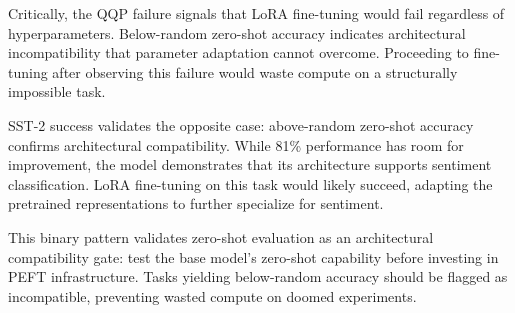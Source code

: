 Critically, the QQP failure signals that LoRA fine-tuning would fail regardless of hyperparameters. Below-random zero-shot accuracy indicates architectural incompatibility that parameter adaptation cannot overcome. Proceeding to fine-tuning after observing this failure would waste compute on a structurally impossible task.

SST-2 success validates the opposite case: above-random zero-shot accuracy confirms architectural compatibility. While 81\% performance has room for improvement, the model demonstrates that its architecture supports sentiment classification. LoRA fine-tuning on this task would likely succeed, adapting the pretrained representations to further specialize for sentiment.

This binary pattern validates zero-shot evaluation as an architectural compatibility gate: test the base model's zero-shot capability before investing in PEFT infrastructure. Tasks yielding below-random accuracy should be flagged as incompatible, preventing wasted compute on doomed experiments.
